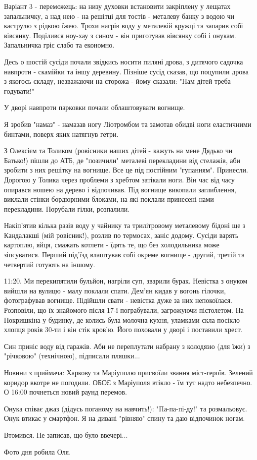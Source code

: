 Варіант 3 - переможець: на низу духовки встановити закріплену у лещатах
запальничку, а над нею - на решітці для тостів - металеву банку з водою чи
каструлю з рідкою їжею. Трохи  нагрів воду у металевій кружці та запарив собі
вівсянку. Поділився ноу-хау з сином - він приготував вівсянку собі і онукам.
Запальничка гріє слабо та економно.

Десь о шостій сусіди почали звідкись носити пиляні дрова, з дитячого садочка
навпроти - скамійки та іншу деревину. Пізніше сусід сказав, що поцупили дрова з
якогось складу, незважаючи на сторожа - йому сказали: "Нам дітей треба
годувати!"

У дворі навпроти парковки почали облаштовувати вогнище.

Я зробив "намаз" - намазав ногу Ліотромбом та замотав обидві ноги еластичними
бинтами, поверх яких натягнув гетри.

З Олексієм та Толиком (ровісники наших дітей - кажуть на мене Дядько чи
Батько!) пішли до АТБ, де "позичили" металеві перекладини від стелажів, аби
зробити з них решітку на вогнище. Все це під постійним "гупанням". Принесли.
Дорогою у Толика через проблеми з хребтом затікали ноги. Він час від часу
опирався ношею на дерево і відпочивав. Під вогнище викопали заглиблення,
виклали стінки бордюрними блоками, на які поклали принесені нами перекладини.
Порубали гілки, розпалили.

Накіп'ятив кілька разів воду у чайнику та трилітровому металевому бідоні ще з
Кандалакші  (мій ровісник!), розлив по термосах, заніс додому. Сусіди варять
картоплю, яйця, смажать котлети - їдять те, що без холодильника може
зіпсуватися. Перший під'їзд влаштував собі окреме вогнище - другий, третій та
четвертий готують на іншому.

11:20. Ми перекипятили бульйон, нагріли суп, зварили бурак. Невістка з онуком
вийшли на вулицю - малу поклали спати. Дем'ян кидав у вогонь гілочки,
фотографував вогнище. Підійшли свати - невістка дуже за них непокоїлася.
Розповіли, що їх знайомого після 17-ї пограбували, загрожуючи пістолетом. На
Покришкіна у будинку,  де колись була молочна кухня, уламками скла посікло
хлопця років 30-ти і він стік кров'ю. Його поховали у дворі і поставили хрест.

Син приніс воду від гаражів. Аби не переплутати набрану з колодязю (для їжи) з
"річковою" (технічною), підписали пляшки...

Новини з приймача: Харкову та Маріуполю присвоїли звання міст-героїв. Зелений
коридор вкотре не погодили. ОБСЄ з Маріуполя втікло - їм тут надто небезпечно.
О 16:00 почнеться новий раунд перемов.

Онука співає джаз (дідусь поганому на навчить!): "Па-па-пі-ду!" та розмальовує.
Онук втикає у смартфон. Я на дивані "рівняю" спину та даю відпочинок ногам.

Втомився. Не записав, що було ввечері...

Фото дня робила Оля.

